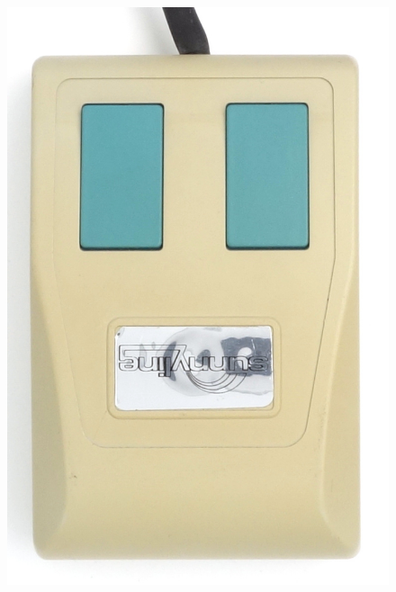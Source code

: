 \documentclass[11pt, a4paper]{article}
\begin{document}
\begin{figure}[h]
    \centering
    \includegraphics[scale=0.8]{1986_sunnyline_digimouse/top_30.jpg}

\end{figure}
\end{document}
